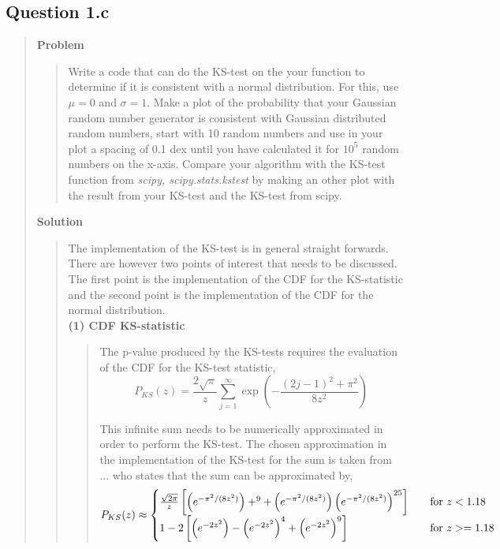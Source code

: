 
\subsection*{\textbf{Question 1.c}}
\begin{quote}

\textbf{Problem}
\begin{quote}
Write a code that can do the KS-test on the your function to determine if it is consistent with a normal distribution. For this, use $\mu = 0$ and $\sigma = 1$. Make a plot of the probability that your Gaussian random number generator is consistent with Gaussian distributed random numbers, start with 10 random numbers and use in your plot a spacing of 0.1 dex until you have calculated it for $10^5$ random numbers on the x-axis. Compare your algorithm with the KS-test function from \textit{scipy, scipy.stats.kstest} by making an other plot with the result from your KS-test and the KS-test from scipy.
\end{quote}

\textbf{Solution} 
\begin{quote}
The implementation of the KS-test is in general straight forwards. There are however two points of interest that needs to be discussed. The first point is the implementation of the CDF for the KS-statistic and the second point is the implementation of the CDF for the normal distribution.
\\

\textbf{(1) CDF KS-statistic }
\begin{quote}
The p-value produced by the KS-tests requires the evaluation of the CDF for the KS-test statistic,
\begin{equation}
P_{KS}(z) = \frac{2\sqrt{\pi}}{z} \sum_{j=1}^{\infty} \exp\left(- \frac{(2j-1)^2+\pi^2}{8z^2} \right)
\end{equation}

This infinite sum needs to be numerically approximated in order to perform the KS-test. The chosen approximation in the implementation of the KS-test for  the sum is taken from ... who states that the sum can be approximated by, %
\begin{equation}
P_{KS}(z) \approx
\begin{cases}
\frac{\sqrt{2 \pi}}{z} \left[ \left( e^{-\pi^2/(8z^2)} \right)+^{9} + \left( e^{-\pi^2/(8z^2)} \right) \left( e^{-\pi^2/(8z^2)} \right)^{25} \right] &\quad \text{for $ z < 1.18$}\\
1 -2 \left[ \left(e^{-2z^2}\right) - \left(e^{-2z^2}\right)^4 + \left(e^{-2z^2}\right)^9 \right]  &\quad \text{for $ z >= 1.18$}
\end{cases}
\end{equation}
\end{quote}


\end{quote}
\end{quote}
